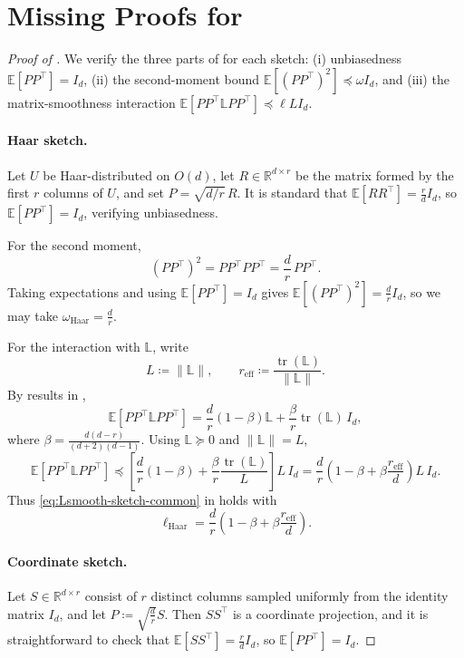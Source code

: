 \documentclass[10pt]{article}
\newcommand{\tr}{\operatorname{tr}}
\newcommand{\E}{\mathbb{E}}
\newcommand{\R}{\mathbb{R}}
\newcommand{\Lmat}{\mathbb{L}}
\begin{document}
\section{Missing Proofs for  }
\label{app:missing-proofs-sketch}



\begin{proof}[Proof of ]
We verify the three parts of  for each sketch:
(i) unbiasedness \(\E[PP^\top]=I_d\),
(ii) the second-moment bound \(\E[(PP^\top)^2]\preceq \omega I_d\),
and (iii) the matrix-smoothness interaction
\(\E[PP^\top \Lmat PP^\top]\preceq \ell L I_d\).

\paragraph{Haar sketch.}
Let \(U\) be Haar-distributed on \(O(d)\), let
\(R\in\mathbb{R}^{d\times r}\) be the matrix formed by the first \(r\) columns
of \(U\), and set \(P=\sqrt{d/r}\,R\).
It is standard that \(\E[RR^\top]=\frac{r}{d}I_d\), so \(\E[PP^\top]=I_d\), verifying unbiasedness.

For the second moment, 
\[
(PP^\top)^2
=
PP^\top PP^\top
=
\frac{d}{r}\,PP^\top.
\]
Taking expectations and using \(\E[PP^\top]=I_d\) gives
\(\E[(PP^\top)^2]=\frac{d}{r}I_d\), so we may take \(\omega_{\mathrm{Haar}}=\frac{d}{r}\).

For the interaction with \(\Lmat\), write
\[
L\coloneqq\|\Lmat\|,
\qquad
r_{\mathrm{eff}}\coloneqq\frac{\tr(\Lmat)}{\|\Lmat\|}.
\]
By results in \cite{flynn2024},
\[
\E[PP^\top \Lmat PP^\top]
=
\frac{d}{r}(1-\beta)\Lmat+\frac{\beta}{r}\tr(\Lmat)\,I_d,
\]
where \(\beta=\frac{d(d-r)}{(d+2)(d-1)}\).
Using \(\Lmat\succeq 0\) and \(\|\Lmat\|=L\),
\[
\E[PP^\top \Lmat PP^\top]
\preceq
\left[\frac{d}{r}(1-\beta)+\frac{\beta}{r}\frac{\tr(\Lmat)}{L}\right]L\,I_d
=
\frac{d}{r}\left(1-\beta+\beta\frac{r_{\mathrm{eff}}}{d}\right)L\,I_d.
\]
Thus \eqref{eq:Lsmooth-sketch-common}  in  holds with
\[
\ell_{\mathrm{Haar}}
=
\frac{d}{r}\left(1-\beta+\beta\frac{r_{\mathrm{eff}}}{d}\right).
\]

\paragraph{Coordinate sketch.}
Let \(S\in\R^{d\times r}\) consist of \(r\) distinct columns sampled uniformly from the identity
matrix \(I_d\), and let \(P\coloneqq\sqrt{\frac{d}{r}}S\).
Then \(SS^\top\) is a coordinate projection, and it is straightforward to check that
\(\E[SS^\top]=\frac{r}{d}I_d\), so \(\E[PP^\top]=I_d\).


\end{proof}
\end{document}
